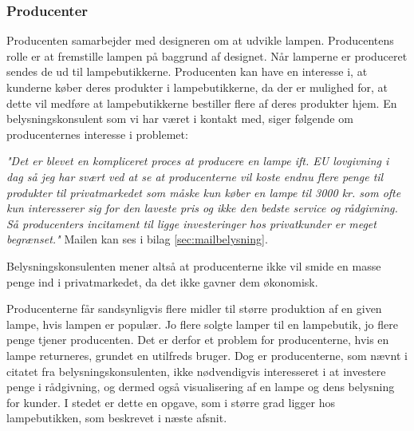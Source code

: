 \subsubsection{Producenter}
Producenten samarbejder med designeren om at udvikle lampen. Producentens rolle er at fremstille lampen på baggrund af designet. Når lamperne er produceret sendes de ud til lampebutikkerne. Producenten kan have en interesse i, at kunderne køber deres produkter i lampebutikkerne, da der er mulighed for, at dette vil medføre at lampebutikkerne bestiller flere af deres produkter hjem. En belysningskonsulent som vi har været i kontakt med, siger følgende om producenternes interesse i problemet:

\begin{center}
\textit{"Det er blevet en kompliceret proces at producere en lampe ift. EU lovgivning i dag så jeg har svært ved at se at producenterne vil koste endnu flere penge til produkter til privatmarkedet som måske kun køber en lampe til 3000 kr. som ofte kun interesserer sig for den laveste pris og ikke den bedste service og rådgivning. Så producenters incitament til ligge investeringer hos privatkunder er meget begrænset."} Mailen kan ses i bilag \ref{sec:mailbelysning}. 
\end{center}

Belysningskonsulenten mener altså at producenterne ikke vil smide en masse penge ind i privatmarkedet, da det ikke gavner dem økonomisk. 

Producenterne får sandsynligvis flere midler til større produktion af en given lampe, hvis lampen er populær. Jo flere solgte lamper til en lampebutik, jo flere penge tjener producenten. Det er derfor et problem for producenterne, hvis en lampe returneres, grundet en utilfreds bruger. Dog er producenterne, som nævnt i citatet fra belysningskonsulenten, ikke nødvendigvis interesseret i at investere penge i rådgivning, og dermed også visualisering af en lampe og dens belysning for kunder. I stedet er dette en opgave, som i større grad ligger hos lampebutikken, som beskrevet i næste afsnit.

